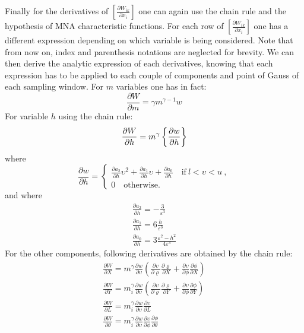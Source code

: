 Finally for the derivatives of $\left[\frac{\partial W_{ik}}{\partial x_i}\right]$ one can again use the chain rule and the hypothesis of MNA characteristic functions. For each row of  $\left[\frac{\partial W_{ik}}{\partial x_i}\right]$  one has a different expression depending on which variable is being considered. Note that from now on, index and parenthesis notations are neglected for brevity. We can then derive the analytic expression of each derivatives, knowing that each expression has to be applied to each couple of components and point of Gauss of each sampling window. For $m$ variables one has in fact:
\begin{equation}
    \frac{\partial W}{\partial m}=\gamma m^{\gamma-1}w
\end{equation}
For variable $h$ using the chain rule:
\begin{equation}
    \frac{\partial W}{\partial h}= m^{\gamma} \left\{{\frac{\partial w}{\partial h}}\right\}
\end{equation}
where
\begin{equation}
     \frac{\partial w}{\partial h}=\begin{cases}
         \frac{\partial a_2}{\partial h}\upsilon^2+\frac{\partial a_1}{\partial h}\upsilon+\frac{\partial a_0}{\partial h} \quad \text{if} \ l<\upsilon<u\ ,\\
         0 \quad \text{otherwise.}
    \end{cases}
\end{equation}
and where 
\begin{eqnarray}
\frac{\partial a_2}{\partial h}=-\frac{3}{\varepsilon^3}\\
\frac{\partial a_1}{\partial h}=6\frac{h}{\varepsilon^3}\\
\frac{\partial a_0}{\partial h}=3\frac{ \varepsilon^2-h^2}{4\varepsilon^3}
\end{eqnarray}
For the other components, following derivatives are obtained by the chain rule:
\begin{eqnarray}
\frac{\partial W}{\partial X}=m^\gamma\frac{\partial w}{\partial \upsilon}\left(\frac{\partial \upsilon}{\partial \varrho}\frac{\partial \varrho}{\partial X}+\frac{\partial \upsilon}{\partial \phi}\frac{\partial \phi}{\partial X}\right)\\
\frac{\partial W}{\partial Y}=m_i^\gamma\frac{\partial w}{\partial \upsilon}\left(\frac{\partial \upsilon}{\partial \varrho}\frac{\partial \varrho}{\partial Y}+\frac{\partial \upsilon}{\partial \phi}\frac{\partial \phi}{\partial Y}\right)\\
\frac{\partial W}{\partial L}=m_i^\gamma\frac{\partial w}{\partial \upsilon}\frac{\partial \upsilon}{\partial L}\\
\frac{\partial W}{\partial \theta}=m_i^\gamma\frac{\partial w}{\partial \upsilon}\frac{\partial \upsilon}{\partial \phi}\frac{\partial \phi}{\partial \theta}
\end{eqnarray}
